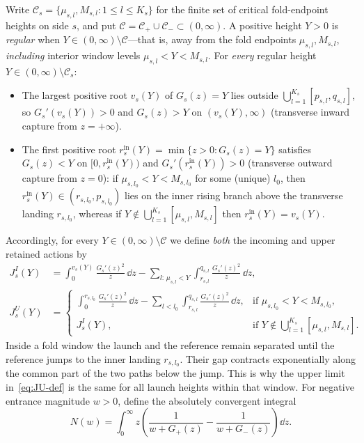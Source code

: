 Write $\mathcal{C}_s=\{\mu_{s,l},M_{s,l}:1\le l\le K_s\}$ for the finite set of critical fold-endpoint heights on side $s$, and put $\mathcal{C}=\mathcal{C}_+\cup\mathcal{C}_-\subset(0,\infty)$. A positive height $Y>0$ is \emph{regular} when $Y\in(0,\infty)\setminus\mathcal{C}$—that is, away from the fold endpoints $\mu_{s,l},M_{s,l}$, \emph{including} interior window levels $\mu_{s,l}<Y<M_{s,l}$. For \emph{every} regular height $Y\in(0,\infty)\setminus\mathcal{C}_s$:
\begin{itemize}
  \item The largest positive root $v_s(Y)$ of $G_s(z)=Y$ lies outside $\bigcup_{l=1}^{K_s}[p_{s,l},q_{s,l}]$, so $G_s'(v_s(Y))>0$ and $G_s(z)>Y$ on $(v_s(Y),\infty)$ (transverse inward capture from $z=+\infty$).
  \item The first positive root $r_s^{\mathrm{in}}(Y)=\min\{z>0:G_s(z)=Y\}$ satisfies $G_s(z)<Y$ on $[0,r_s^{\mathrm{in}}(Y))$ and $G_s'(r_s^{\mathrm{in}}(Y))>0$ (transverse outward capture from $z=0$): if $\mu_{s,l_0}<Y<M_{s,l_0}$ for some (unique) $l_0$, then $r_s^{\mathrm{in}}(Y)\in(r_{s,l_0},p_{s,l_0})$ lies on the inner rising branch above the transverse landing $r_{s,l_0}$, whereas if $Y\notin\bigcup_{l=1}^{K_s}[\mu_{s,l},M_{s,l}]$ then $r_s^{\mathrm{in}}(Y)=v_s(Y)$.
\end{itemize}
Accordingly, for every $Y\in(0,\infty)\setminus\mathcal{C}$ we define \emph{both} the incoming and upper retained actions by
\begin{align}
  J_s^I(Y) &= \int_0^{v_s(Y)}\frac{G_s'(z)^2}{z}\,\dd z - \sum_{l:\,\mu_{s,l}<Y}\int_{r_{s,l}}^{q_{s,l}}\frac{G_s'(z)^2}{z}\,\dd z,\label{eq:JI-def}\\
  J_s^U(Y) &= \begin{cases}
    \displaystyle\int_0^{r_{s,l_0}}\frac{G_s'(z)^2}{z}\,\dd z - \sum_{l<l_0}\int_{r_{s,l}}^{q_{s,l}}\frac{G_s'(z)^2}{z}\,\dd z, & \text{if }\mu_{s,l_0}<Y<M_{s,l_0},\\[1.1ex]
    J_s^I(Y), & \text{if }Y\notin\bigcup_{l=1}^{K_s}[\mu_{s,l},M_{s,l}].
  \end{cases}\label{eq:JU-def}
\end{align}
Inside a fold window the launch and the reference remain separated
until the reference jumps to the inner landing $r_{s,l_0}$. Their gap
contracts exponentially along the common part of the two paths below
the jump. This is why the upper limit in~\eqref{eq:JU-def} is the same
for all launch heights within that window.
For negative entrance magnitude $w>0$, define the absolutely convergent integral
\begin{equation}\label{eq:N-def}
  N(w) = \int_0^\infty z\left(\frac{1}{w+G_+(z)} - \frac{1}{w+G_-(z)}\right)\dd z.
\end{equation}

